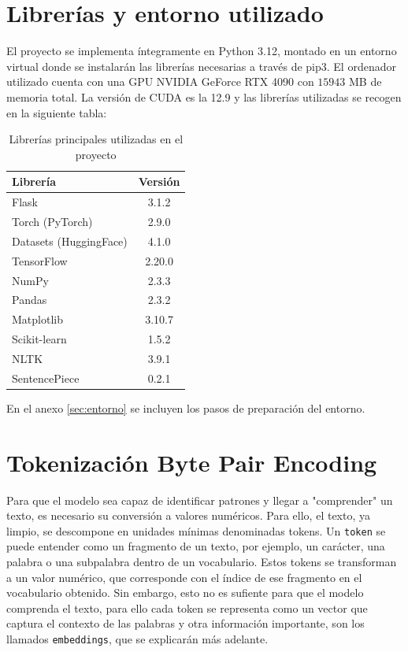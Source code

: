 \documentclass[11pt]{book}
\begin{document}
\section{Librerías y entorno utilizado}
El proyecto se implementa íntegramente en Python 3.12, montado en un entorno virtual donde se instalarán las librerías necesarias a través de pip3. 
El ordenador utilizado cuenta con una GPU NVIDIA GeForce RTX 4090 con $15943$ MB de memoria total. 
La versión de CUDA es la 12.9 y las librerías utilizadas se recogen en la siguiente tabla:

\begin{table}[h]
\centering
\caption{Librerías principales utilizadas en el proyecto}
\label{tab:librerias_principales}
\begin{tabular}{l c}
\toprule
\textbf{Librería} & \textbf{Versión} \\
\midrule
Flask & 3.1.2 \\
Torch (PyTorch) & 2.9.0 \\
Datasets (HuggingFace) & 4.1.0 \\
TensorFlow & 2.20.0 \\
NumPy & 2.3.3 \\
Pandas & 2.3.2 \\
Matplotlib & 3.10.7 \\
Scikit-learn & 1.5.2 \\
NLTK & 3.9.1 \\
SentencePiece & 0.2.1 \\
\bottomrule
\end{tabular}
\end{table}

En el anexo \ref{sec:entorno} se incluyen los pasos de preparación del entorno.

\section{Tokenización Byte Pair Encoding}
Para que el modelo sea capaz de identificar patrones y llegar a "comprender" un texto, es necesario su conversión a valores numéricos. Para ello, el texto, ya limpio, se descompone en unidades mínimas denominadas tokens. Un \texttt{token} se puede entender como un fragmento de un texto, por ejemplo, un carácter, una palabra o una subpalabra dentro de un vocabulario. Estos tokens se transforman a un valor numérico, que corresponde con el índice de ese fragmento en el vocabulario obtenido. Sin embargo, esto no es sufiente para que el modelo comprenda el texto, para ello cada token se representa como un vector que captura el contexto de las palabras y otra información importante, son los llamados \texttt{embeddings}, que se explicarán más adelante.
\end{document}
